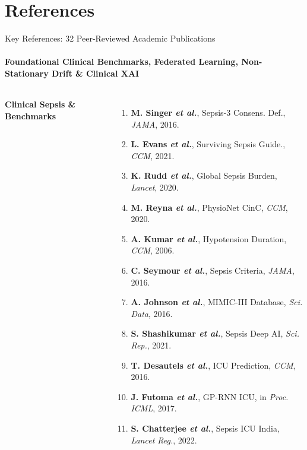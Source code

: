 \documentclass[aspectratio=169, 10pt]{beamer}
\begin{document}
\section{References}
\begin{frame}{Key References: 32 Peer-Reviewed Academic Publications}
    \framesubtitle{Foundational Clinical Benchmarks, Federated Learning, Non-Stationary Drift \& Clinical XAI}
    \begin{columns}[T]
        {\fontsize{4.8pt}{5.8pt}\selectfont
        \textbf{\textcolor{amritaMaroon}{Clinical Sepsis \& Benchmarks}}
        \begin{enumerate}
            \setlength\itemsep{0.14em}
            \item \textbf{M. Singer \textit{et al.}}, Sepsis-3 Consens. Def., \textit{JAMA}, 2016.
            \item \textbf{L. Evans \textit{et al.}}, Surviving Sepsis Guide., \textit{CCM}, 2021.
            \item \textbf{K. Rudd \textit{et al.}}, Global Sepsis Burden, \textit{Lancet}, 2020.
            \item \textbf{M. Reyna \textit{et al.}}, PhysioNet CinC, \textit{CCM}, 2020.
            \item \textbf{A. Kumar \textit{et al.}}, Hypotension Duration, \textit{CCM}, 2006.
            \item \textbf{C. Seymour \textit{et al.}}, Sepsis Criteria, \textit{JAMA}, 2016.
            \item \textbf{A. Johnson \textit{et al.}}, MIMIC-III Database, \textit{Sci. Data}, 2016.
            \item \textbf{S. Shashikumar \textit{et al.}}, Sepsis Deep AI, \textit{Sci. Rep.}, 2021.
            \item \textbf{T. Desautels \textit{et al.}}, ICU Prediction, \textit{CCM}, 2016.
            \item \textbf{J. Futoma \textit{et al.}}, GP-RNN ICU, in \textit{Proc. ICML}, 2017.
            \item \textbf{S. Chatterjee \textit{et al.}}, Sepsis ICU India, \textit{Lancet Reg.}, 2022.
        \end{enumerate}
        }


\end{columns}
\end{frame}
\end{document}
